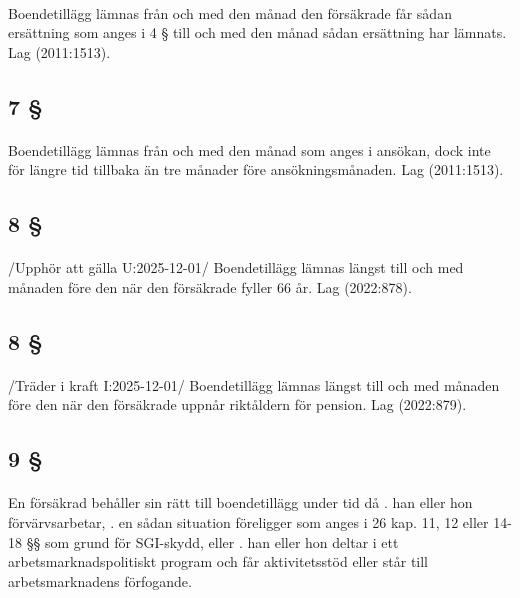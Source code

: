 \documentclass[a4paper,notitlepage,openany,10pt]{book}
\begin{document}
\paragraph*{}
Boendetillägg lämnas från och med den månad den försäkrade får sådan ersättning som anges i 4 § till och med den månad sådan ersättning har lämnats.
Lag (2011:1513).
\subsection*{7 §}
\paragraph*{}
Boendetillägg lämnas från och med den månad som anges i ansökan, dock inte för längre tid tillbaka än tre månader före ansökningsmånaden.
Lag (2011:1513).
\subsection*{8 §}
\paragraph*{}
/Upphör att gälla U:2025-12-01/
Boendetillägg lämnas längst till och med månaden före den när den försäkrade fyller 66 år.
Lag (2022:878).
\subsection*{8 §}
\paragraph*{}
/Träder i kraft I:2025-12-01/
Boendetillägg lämnas längst till och med månaden före den när den försäkrade uppnår riktåldern för pension.
Lag (2022:879).
\subsection*{9 §}
\paragraph*{}
En försäkrad behåller sin rätt till boendetillägg under tid då
. han eller hon förvärvsarbetar,
. en sådan situation föreligger som anges i 26 kap. 11, 12 eller 14-18 §§ som grund för SGI-skydd, eller
. han eller hon deltar i ett arbetsmarknadspolitiskt program och får aktivitetsstöd eller står till arbetsmarknadens förfogande.
\end{document}
